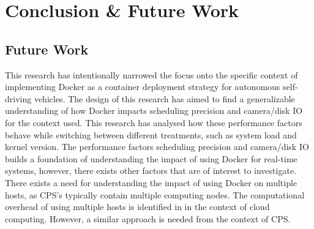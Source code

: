 \iffalse  \fi
\chapter{Conclusion \& Future Work} \label{section:conclusion}


\section{Future Work}
This research has intentionally narrowed the focus onto the specific context of implementing Docker as a container deployment strategy for autonomous self-driving vehicles. The design of this research has aimed to find a generalizable understanding of how Docker impacts scheduling precision and camera/disk IO for the context used. This research has analysed how these performance factors behave while switching between different treatments, such as system load and kernel version. The performance factors scheduling precision and camera/disk IO builds a foundation of understanding the impact of using Docker for real-time systems, however, there exists other factors that are of interest to investigate. There exists a need for understanding the impact of using Docker on multiple hosts, as CPS's typically contain multiple computing nodes. The computational overhead of using multiple hosts is identified in \cite{p1} in the context of cloud computing. However, a similar approach is needed from the context of CPS.








